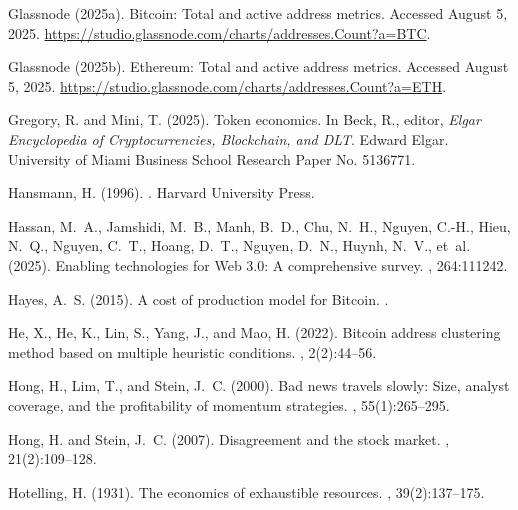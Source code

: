 \documentclass[12pt]{article}
\begin{document}
\begin{thebibliography}{}
{Glassnode} (2025a).
\newblock Bitcoin: Total and active address metrics.
\newblock Accessed August 5, 2025.
\newblock \url{https://studio.glassnode.com/charts/addresses.Count?a=BTC}.

{Glassnode} (2025b).
\newblock Ethereum: Total and active address metrics.
\newblock Accessed August 5, 2025.
\newblock \url{https://studio.glassnode.com/charts/addresses.Count?a=ETH}.

Gregory, R. and Mini, T. (2025).
\newblock Token economics.
\newblock In Beck, R., editor, {\em Elgar Encyclopedia of Cryptocurrencies,
  Blockchain, and DLT}. Edward Elgar.
\newblock University of Miami Business School Research Paper No. 5136771.

Hansmann, H. (1996).
.
\newblock Harvard University Press.

Hassan, M.~A., Jamshidi, M.~B., Manh, B.~D., Chu, N.~H., Nguyen, C.-H., Hieu,
  N.~Q., Nguyen, C.~T., Hoang, D.~T., Nguyen, D.~N., Huynh, N.~V., et~al.
  (2025).
\newblock Enabling technologies for Web 3.0: A comprehensive survey.
, 264:111242.

Hayes, A.~S. (2015).
\newblock A cost of production model for Bitcoin.
.

He, X., He, K., Lin, S., Yang, J., and Mao, H. (2022).
\newblock Bitcoin address clustering method based on multiple heuristic
  conditions.
, 2(2):44--56.

Hong, H., Lim, T., and Stein, J.~C. (2000).
\newblock Bad news travels slowly: Size, analyst coverage, and the
  profitability of momentum strategies.
, 55(1):265--295.

Hong, H. and Stein, J.~C. (2007).
\newblock Disagreement and the stock market.
, 21(2):109--128.

Hotelling, H. (1931).
\newblock The economics of exhaustible resources.
, 39(2):137--175.


\end{thebibliography}
\end{document}

